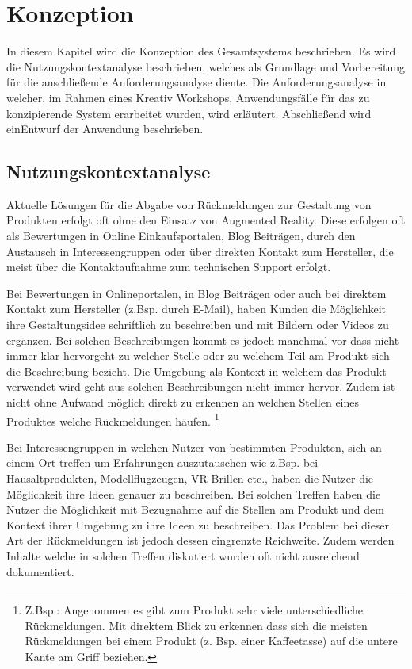 \chapter{Konzeption}

In diesem Kapitel wird die Konzeption des Gesamtsystems beschrieben. Es wird die Nutzungskontextanalyse beschrieben, welches als Grundlage und Vorbereitung für die anschließende Anforderungsanalyse diente. Die Anforderungsanalyse in welcher, im Rahmen eines Kreativ Workshops, Anwendungsfälle für das zu konzipierende System erarbeitet wurden, wird erläutert. Abschließend wird einEntwurf der Anwendung beschrieben.

\section{Nutzungskontextanalyse}

Aktuelle Lösungen für die Abgabe von Rückmeldungen zur Gestaltung von Produkten erfolgt oft ohne den Einsatz von Augmented Reality. Diese erfolgen 
oft als Bewertungen in Online Einkaufsportalen, Blog Beiträgen, durch den Austausch in Interessengruppen oder über direkten Kontakt zum Hersteller, die 
meist über die Kontaktaufnahme zum technischen Support erfolgt.

Bei Bewertungen in Onlineportalen, in Blog Beiträgen oder auch bei direktem Kontakt zum Hersteller (z.Bsp. durch E-Mail), haben Kunden die Möglichkeit 
ihre Gestaltungsidee schriftlich zu beschreiben und mit Bildern oder Videos zu ergänzen. Bei solchen Beschreibungen kommt es jedoch manchmal vor dass 
nicht immer klar hervorgeht zu welcher Stelle oder zu welchem Teil am Produkt sich die Beschreibung bezieht. Die Umgebung als Kontext in welchem das Produkt 
verwendet wird geht aus solchen Beschreibungen nicht immer hervor. Zudem ist nicht ohne Aufwand möglich direkt zu erkennen an welchen Stellen eines Produktes 
welche Rückmeldungen häufen. \footnote{Z.Bsp.: Angenommen es gibt zum Produkt sehr viele unterschiedliche Rückmeldungen. Mit direktem Blick zu erkennen dass sich
die meisten Rückmeldungen bei einem Produkt  (z. Bsp. einer Kaffeetasse) auf die untere Kante am Griff beziehen.} 

Bei Interessengruppen in welchen Nutzer von bestimmten Produkten, sich an einem Ort treffen um Erfahrungen auszutauschen wie z.Bsp. bei Hausaltprodukten, Modellflugzeugen, VR Brillen etc., 
haben die Nutzer die Möglichkeit ihre Ideen genauer zu beschreiben. Bei solchen Treffen haben die Nutzer die Möglichkeit mit Bezugnahme auf die Stellen am Produkt und dem Kontext 
ihrer Umgebung zu ihre Ideen zu beschreiben. Das Problem bei dieser Art der Rückmeldungen ist jedoch dessen eingrenzte Reichweite. Zudem werden Inhalte welche in solchen Treffen diskutiert 
wurden oft nicht ausreichend dokumentiert.  

